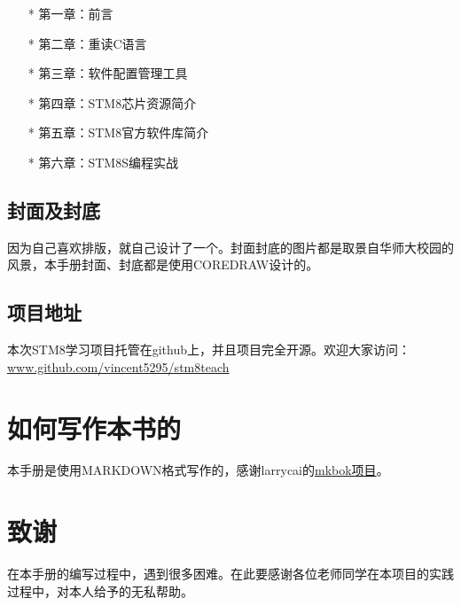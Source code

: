 \documentclass[a4paper]{book}
\makeatletter
\let\savedtitle=\@title
\newcounter{tab}[chapter]
\makeatother
\begin{document}
\begin{itemize}\setlength{\itemsep}{1pt}\setlength{\parskip}{0pt}\setlength{\parsep}{0pt}
\item[*]
  第一章：前言
\item[*]
  第二章：重读C语言
\item[*]
  第三章：软件配置管理工具
\item[*]
  第四章：STM8芯片资源简介
\item[*]
  第五章：STM8官方软件库简介
\item[*]
  第六章：STM8S编程实战
\end{itemize}
\subsection*{封面及封底}

因为自己喜欢排版，就自己设计了一个。封面封底的图片都是取景自华师大校园的风景，本手册封面、封底都是使用COREDRAW设计的。

\subsection*{项目地址}

本次STM8学习项目托管在github上，并且项目完全开源。欢迎大家访问：\href{www.github.com/vincent5295/stm8teach}{www.github.com/vincent5295/stm8teach}

\section*{如何写作本书的}

本手册是使用MARKDOWN格式写作的，感谢larrycai的\href{www.github.com/larrycai/mkbok}{mkbok项目}。

\section*{致谢}

在本手册的编写过程中，遇到很多困难。在此要感谢各位老师同学在本项目的实践过程中，对本人给予的无私帮助。

\tableofcontents\newpage\thispagestyle{empty}


\fancyhf{}
\fancyhead[LE]{\color{colorheader}\quad\small\textbf\thepage\quad\quad\small\leftmark}
\fancyhead[RO]{\color{colorheader}\small\rightmark\quad\quad\small\textbf\thepage\quad}
\end{document}
